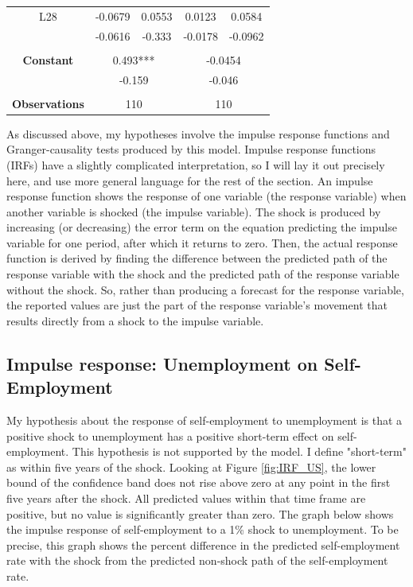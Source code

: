 \documentclass[]{ecca}
\begin{document}
\begin{center}
\begin{longtable}{ccccc}
		L28          & -0.0679   & 0.0553    & 0.0123   & 0.0584    \\
		& -0.0616   & -0.333    & -0.0178  & -0.0962   \\
		& & & & \\
		\textbf{Constant} & \multicolumn{2}{c}{0.493***}  & \multicolumn{2}{c}{-0.0454}    \\
		\textbf{} & \multicolumn{2}{c}{-0.159}  & \multicolumn{2}{c}{-0.046}       \\
		&           &           &          &           \\
		\textbf{Observations} & \multicolumn{2}{c}{110}  & \multicolumn{2}{c}{110}           
		
	\end{longtable}
\end{center}

As discussed above, my hypotheses involve the impulse response functions and Granger-causality tests produced by this model. Impulse response functions (IRFs) have a slightly complicated interpretation, so I will lay it out precisely here, and use more general language for the rest of the section. An impulse response function shows the response of one variable (the response variable) when another variable is shocked (the impulse variable). The shock is produced by increasing (or decreasing) the error term on the equation predicting the impulse variable for one period, after which it returns to zero. Then, the actual response function is derived by finding the difference between the predicted path of the response variable with the shock and the predicted path of the response variable without the shock. So, rather than producing a forecast for the response variable, the reported values are just the part of the response variable's movement that results directly from a shock to the impulse variable.

\subsection{Impulse response: Unemployment on Self-Employment}

My hypothesis about the response of self-employment to unemployment is that a positive shock to unemployment has a positive short-term effect on self-employment. This hypothesis is not supported by the model. I define "short-term" as within five years of the shock. Looking at Figure \ref{fig:IRF_US}, the lower bound of the confidence band does not rise above zero at any point in the first five years after the shock. All predicted values within that time frame are positive, but no value is significantly greater than zero. The graph below shows the impulse response of self-employment to a 1\% shock to unemployment. To be precise, this graph shows the percent difference in the predicted self-employment rate with the shock from the predicted non-shock path of the self-employment rate.
\end{document}
